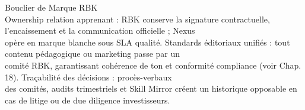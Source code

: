 \documentclass[12pt,landscape,a4paper]{article}
\begin{document}
\vspace{0.5em}
\vspace{0.5em}
Bouclier de Marque RBK\\
\vspace{0.5em}
Ownership relation apprenant : RBK conserve la signature contractuelle, l’encaissement et la communication officielle ; Nexus\\
opère en marque blanche sous SLA qualité. Standards éditoriaux unifiés : tout contenu pédagogique ou marketing passe par un\\
comité RBK, garantissant cohérence de ton et conformité compliance (voir Chap. 18). Traçabilité des décisions : procès-verbaux\\
des comités, audits trimestriels et Skill Mirror créent un historique opposable en cas de litige ou de due diligence investisseurs.\\
\vspace{0.5em}
\vspace{0.5em}
\end{document}
